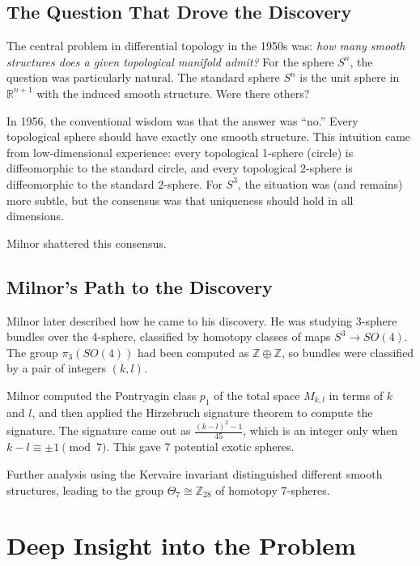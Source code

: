 \subsection{The Question That Drove the Discovery}

The central problem in differential topology in the 1950s was: \emph{how many smooth structures does a given topological manifold admit?} For the sphere $S^n$, the question was particularly natural. The standard sphere $S^n$ is the unit sphere in $\mathbb{R}^{n+1}$ with the induced smooth structure. Were there others?

In 1956, the conventional wisdom was that the answer was ``no.'' Every topological sphere should have exactly one smooth structure. This intuition came from low-dimensional experience: every topological 1-sphere (circle) is diffeomorphic to the standard circle, and every topological 2-sphere is diffeomorphic to the standard 2-sphere. For $S^3$, the situation was (and remains) more subtle, but the consensus was that uniqueness should hold in all dimensions.

Milnor shattered this consensus.

\subsection{Milnor's Path to the Discovery}

Milnor later described how he came to his discovery. He was studying 3-sphere bundles over the 4-sphere, classified by homotopy classes of maps $S^3 \to SO(4)$. The group $\pi_3(SO(4))$ had been computed as $\mathbb{Z} \oplus \mathbb{Z}$, so bundles were classified by a pair of integers $(k,l)$.

Milnor computed the Pontryagin class $p_1$ of the total space $M_{k,l}$ in terms of $k$ and $l$, and then applied the Hirzebruch signature theorem to compute the signature. The signature came out as $\frac{(k-l)^2 - 1}{45}$, which is an integer only when $k-l \equiv \pm1 \pmod{7}$. This gave 7 potential exotic spheres.

Further analysis using the Kervaire invariant distinguished different smooth structures, leading to the group $\Theta_7 \cong \mathbb{Z}_{28}$ of homotopy 7-spheres.

\section{Deep Insight into the Problem}

